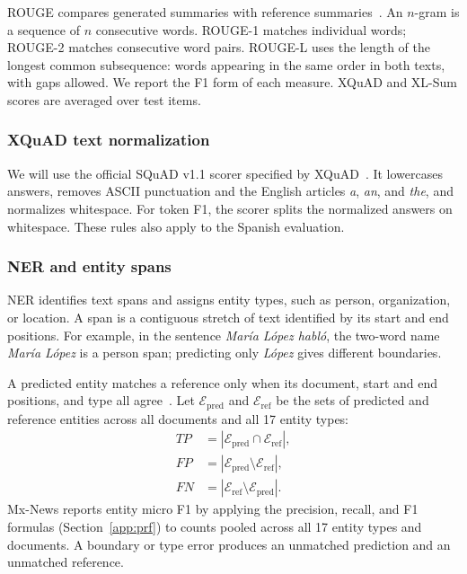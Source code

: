 \documentclass{article}
\begin{document}
ROUGE compares generated summaries with reference summaries~\cite{ROUGE}. An \(n\)-gram is a sequence of \(n\) consecutive words. ROUGE-1 matches individual words; ROUGE-2 matches consecutive word pairs. ROUGE-L uses the length of the longest common subsequence: words appearing in the same order in both texts, with gaps allowed. We report the F1 form of each measure. XQuAD and XL-Sum scores are averaged over test items.
\subsubsection{XQuAD text normalization}
We will use the official SQuAD v1.1 scorer specified by XQuAD~\cite{XQuad}. It lowercases answers, removes ASCII punctuation and the English articles \emph{a}, \emph{an}, and \emph{the}, and normalizes whitespace. For token F1, the scorer splits the normalized answers on whitespace. These rules also apply to the Spanish evaluation.

\subsubsection{NER and entity spans}
\label{app:ner}
NER identifies text spans and assigns entity types, such as person, organization, or location. A span is a contiguous stretch of text identified by its start and end positions. For example, in the sentence \emph{María López habló}, the two-word name \emph{María López} is a person span; predicting only \emph{López} gives different boundaries.

A predicted entity matches a reference only when its document, start and end positions, and type all agree~\cite{CoNLL2003}. Let \(\mathcal{E}_{\mathrm{pred}}\) and \(\mathcal{E}_{\mathrm{ref}}\) be the sets of predicted and reference entities across all documents and all 17 entity types:
\[
\begin{aligned}
TP &= |\mathcal{E}_{\mathrm{pred}} \cap \mathcal{E}_{\mathrm{ref}}|,\\
FP &= |\mathcal{E}_{\mathrm{pred}} \setminus \mathcal{E}_{\mathrm{ref}}|,\\
FN &= |\mathcal{E}_{\mathrm{ref}} \setminus \mathcal{E}_{\mathrm{pred}}|.
\end{aligned}
\]
Mx-News reports entity micro F1 by applying the precision, recall, and F1 formulas (Section~\ref{app:prf}) to counts pooled across all 17 entity types and documents. A boundary or type error produces an unmatched prediction and an unmatched reference.
\end{document}
